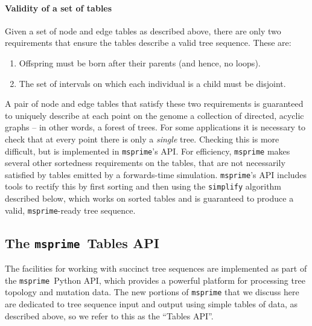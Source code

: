 \documentclass{article}
\newcommand{\msprime}{\texttt{msprime}}
\begin{document}
\paragraph{Validity of a set of tables}
Given a set of node and edge tables as described above,
there are only two requirements that ensure the tables
describe a valid tree sequence.
These are:
\begin{enumerate}
    \item Offspring must be born after their parents (and hence, no loops).
    \item The set of intervals on which each individual is a child must be disjoint.
\end{enumerate}
A pair of node and edge tables that satisfy these two requirements
is guaranteed to uniquely describe at each point on the genome
a collection of directed, acyclic graphs -- in other words, a forest of trees.
For some applications it is necessary to check that at every point
there is only a \emph{single} tree.
Checking this is more difficult, but is implemented in \msprime{}'s API.
For efficiency, \msprime{} makes several other sortedness requirements on the tables,
that are not necessarily satisfied by tables emitted by a forwards-time simulation.
\msprime{}'s API includes tools to rectify this by first sorting %
and then using the \texttt{simplify} algorithm described below, which works on sorted tables
and is guaranteed to produce a valid, \msprime{}-ready tree sequence.



\subsection*{The \msprime\ Tables API}

The facilities for working with succinct tree sequences are implemented as part
of the \msprime\ Python API, which provides a powerful platform for processing
tree topology and mutation data. The new portions of \msprime{} that we discuss
here are dedicated to tree sequence input and output using simple tables of
data, as described above, so we refer to this as the ``Tables API''.
\end{document}
